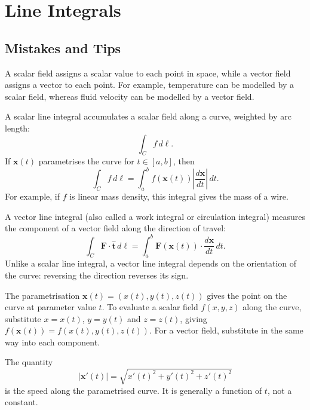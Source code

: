 \section{Line Integrals}

\subsection{Mistakes and Tips}

\begin{blackbox}
  A scalar field assigns a scalar value to each point in space, while a vector field assigns a vector to each point. For example, temperature can be modelled by a scalar field, whereas fluid velocity can be modelled by a vector field.
\end{blackbox}

\begin{blackbox}
  A scalar line integral accumulates a scalar field along a curve, weighted by arc length:
  \[
    \int_C f\,d\ell.
  \]
  If $\mathbf{x}(t)$ parametrises the curve for $t\in[a,b]$, then
  \[
    \int_C f\,d\ell
    =\int_a^b f(\mathbf{x}(t))
      \left|\frac{d\mathbf{x}}{dt}\right|\,dt.
  \]
  For example, if $f$ is linear mass density, this integral gives the mass of a wire.

  A vector line integral (also called a work integral or circulation integral) measures the component of a vector field along the direction of travel:
  \[
    \int_C \mathbf{F}\cdot\hat{\mathbf{t}}\,d\ell
    =\int_a^b \mathbf{F}(\mathbf{x}(t))
      \cdot\frac{d\mathbf{x}}{dt}\,dt.
  \]
  Unlike a scalar line integral, a vector line integral depends on the orientation of the curve: reversing the direction reverses its sign.
\end{blackbox}

\begin{mistake}
  The parametrisation $\mathbf{x}(t)=(x(t),y(t),z(t))$ gives the point on the curve at parameter value $t$. To evaluate a scalar field $f(x,y,z)$ along the curve, substitute
  $x=x(t)$, $y=y(t)$ and $z=z(t)$, giving $f(\mathbf{x}(t))=f(x(t),y(t),z(t))$. For a vector field, substitute in the same way into each component.
\end{mistake}

\begin{mistake}
  The quantity
  \[
    |\mathbf{x}'(t)|=\sqrt{x'(t)^2+y'(t)^2+z'(t)^2}
  \]
  is the speed along the parametrised curve. It is generally a function of $t$, not a constant.
\end{mistake}

